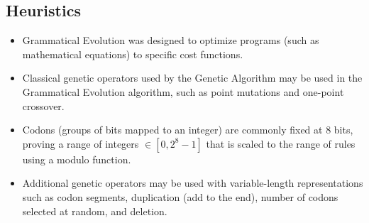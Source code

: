 \subsection{Heuristics}
\begin{itemize}
	\item Grammatical Evolution was designed to optimize programs (such as mathematical equations) to specific cost functions.
	\item Classical genetic operators used by the Genetic Algorithm may be used in the Grammatical Evolution algorithm, such as point mutations and one-point crossover.
	\item Codons (groups of bits mapped to an integer) are commonly fixed at 8 bits, proving a range of integers $\in [0,2^{8}-1]$ that is scaled to the range of rules using a modulo function.
	\item Additional genetic operators may be used with variable-length representations such as codon segments, duplication (add to the end), number of codons selected at random, and deletion.
\end{itemize}

